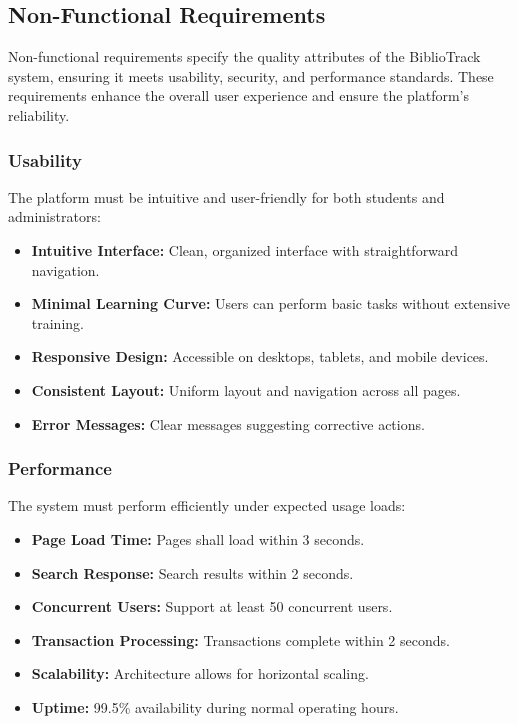 \documentclass[12pt,a4paper]{report}
\begin{document}
\subsection{Non-Functional Requirements}
\label{subsec:nonfunctional}

Non-functional requirements specify the quality attributes of the BiblioTrack system, ensuring it meets usability, security, and performance standards. These requirements enhance the overall user experience and ensure the platform's reliability.
\subsubsection{Usability}

The platform must be intuitive and user-friendly for both students and administrators:

\begin{itemize}
    \item \textbf{Intuitive Interface:} Clean, organized interface with straightforward navigation.
    \item \textbf{Minimal Learning Curve:} Users can perform basic tasks without extensive training.
    \item \textbf{Responsive Design:} Accessible on desktops, tablets, and mobile devices.
    \item \textbf{Consistent Layout:} Uniform layout and navigation across all pages.
    \item \textbf{Error Messages:} Clear messages suggesting corrective actions.
\end{itemize}

\newpage

\subsubsection{Performance}

The system must perform efficiently under expected usage loads:

\begin{itemize}
    \item \textbf{Page Load Time:} Pages shall load within 3 seconds.
    \item \textbf{Search Response:} Search results within 2 seconds.
    \item \textbf{Concurrent Users:} Support at least 50 concurrent users.
    \item \textbf{Transaction Processing:} Transactions complete within 2 seconds.
    \item \textbf{Scalability:} Architecture allows for horizontal scaling.
    \item \textbf{Uptime:} 99.5\% availability during normal operating hours.
\end{itemize}
\end{document}
